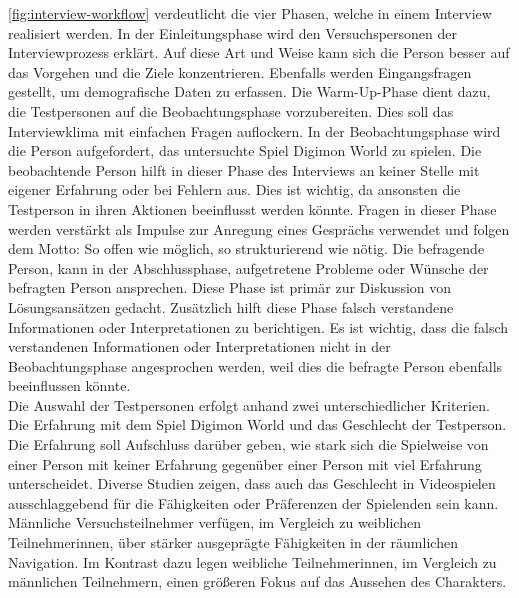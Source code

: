 \autoref{fig:interview-workflow} verdeutlicht die vier Phasen, welche in einem Interview realisiert werden. In der Einleitungsphase wird den Versuchspersonen der Interviewprozess erklärt.
Auf diese Art und Weise kann sich die Person besser auf das Vorgehen und die Ziele konzentrieren.
Ebenfalls werden Eingangsfragen gestellt, um demografische Daten zu erfassen. Die Warm-Up-Phase dient dazu, die Testpersonen auf die Beobachtungsphase vorzubereiten. Dies soll das Interviewklima mit einfachen Fragen auflockern\cite{methods-of-data-collection}. In der Beobachtungsphase wird die Person aufgefordert, das untersuchte Spiel Digimon World zu spielen. Die beobachtende Person hilft in dieser Phase des Interviews an keiner Stelle mit eigener Erfahrung oder bei Fehlern aus. Dies ist wichtig, da ansonsten die Testperson in ihren Aktionen beeinflusst werden könnte.
Fragen in dieser Phase werden verstärkt als Impulse zur Anregung eines Gesprächs verwendet und folgen dem Motto: \glqq So offen wie möglich, so strukturierend wie nötig\grqq{}\cite[S. 563]{handbuch-methoden-der-empirischen-sozialforschung}\cite[S. 126]{methoden-in-der-naturwissenschaft}.
Die befragende Person, kann in der Abschlussphase, aufgetretene Probleme oder Wünsche der befragten Person ansprechen. Diese Phase ist primär zur Diskussion von Lösungsansätzen gedacht. Zusätzlich hilft diese Phase falsch verstandene Informationen oder Interpretationen zu berichtigen. Es ist wichtig, dass die falsch verstandenen Informationen oder Interpretationen nicht in der Beobachtungsphase angesprochen werden, weil dies die befragte Person ebenfalls beeinflussen könnte.\\

Die Auswahl der Testpersonen erfolgt anhand zwei unterschiedlicher Kriterien. Die Erfahrung mit dem Spiel Digimon World und das Geschlecht der Testperson. Die Erfahrung soll Aufschluss darüber geben, wie stark sich die Spielweise von einer Person mit keiner Erfahrung gegenüber einer Person mit viel Erfahrung unterscheidet. Diverse Studien zeigen, dass auch das Geschlecht in Videospielen ausschlaggebend für die Fähigkeiten oder Präferenzen der Spielenden sein kann. Männliche Versuchsteilnehmer verfügen, im Vergleich zu weiblichen Teilnehmerinnen, über stärker ausgeprägte Fähigkeiten in der räumlichen Navigation\cite{gender-maze}\cite{gender-shopping}. Im Kontrast dazu legen weibliche Teilnehmerinnen, im Vergleich zu männlichen Teilnehmern, einen größeren Fokus auf das Aussehen des Charakters\cite{gender-items-in-mmo}\cite{gender-clothes}.\\

